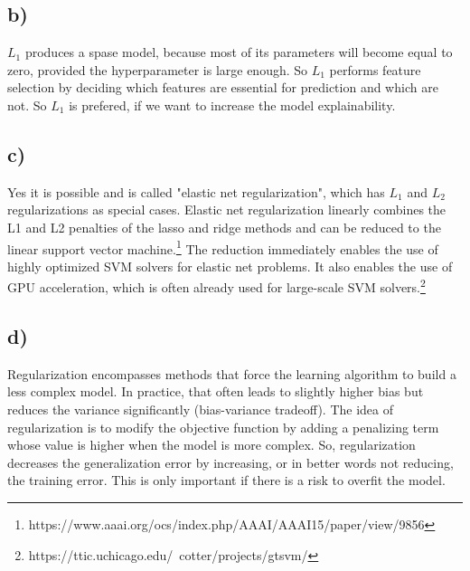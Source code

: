 \documentclass[a4paper]{article}
\begin{document}
    \subsection*{b)}
        $L_1$ produces a spase model, because most of its parameters will become equal to zero, provided the hyperparameter is large enough.
        So $L_1$ performs feature selection by deciding which features are essential for prediction and which are not.
        So $L_1$ is prefered, if we want to increase the model explainability.

    
    \subsection*{c)}
        Yes it is possible and is called "elastic net regularization", which has $L_1$ and $L_2$ regularizations as special cases.
        Elastic net regularization linearly combines the L1 and L2 penalties of the lasso and ridge methods and can be reduced to the linear support vector machine.\footnote{https://www.aaai.org/ocs/index.php/AAAI/AAAI15/paper/view/9856}
        The reduction immediately enables the use of highly optimized SVM solvers for elastic net problems. It also enables the use of GPU acceleration, which is often already used for large-scale SVM solvers.\footnote{https://ttic.uchicago.edu/~cotter/projects/gtsvm/}
    
    \subsection*{d)}
        Regularization encompasses methods that force the learning algorithm to build a less complex model.
        In practice, that often leads to slightly higher bias but reduces the variance significantly (bias-variance tradeoff).
        The idea of regularization is to modify the objective function by adding a penalizing term whose value is higher when the model is more complex.
        So, regularization decreases the generalization error by increasing, or in better words not reducing, the training error.
        This is only important if there is a risk to overfit the model. 

    
\end{document}
